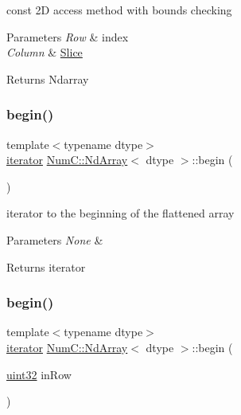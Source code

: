 const 2D access method with bounds checking


\begin{DoxyParams}{Parameters}
{\em Row} & index \\
\hline
{\em Column} & \mbox{\hyperlink{class_num_c_1_1_slice}{Slice}} \\
\hline
\end{DoxyParams}
\begin{DoxyReturn}{Returns}
Ndarray 
\end{DoxyReturn}
\mbox{\label{class_num_c_1_1_nd_array_a3bba56461121f422750bd6b7a69bd9c4}} 
\subsubsection{\texorpdfstring{begin()}{begin()}\hspace{0.1cm}{\footnotesize\ttfamily [1/2]}}
{\footnotesize\ttfamily template$<$typename dtype$>$ \\
\mbox{\hyperlink{class_num_c_1_1_nd_array_a49cd61f019d7106a40ffdb9c3ee98f08}{iterator}} \mbox{\hyperlink{class_num_c_1_1_nd_array}{Num\+C\+::\+Nd\+Array}}$<$ dtype $>$\+::begin (\begin{DoxyParamCaption}{ }\end{DoxyParamCaption})\hspace{0.3cm}{\ttfamily [inline]}}

iterator to the beginning of the flattened array


\begin{DoxyParams}{Parameters}
{\em None} & \\
\hline
\end{DoxyParams}
\begin{DoxyReturn}{Returns}
iterator 
\end{DoxyReturn}
\mbox{\label{class_num_c_1_1_nd_array_a6cca558bd443f861482a6856980fc80f}} 
\subsubsection{\texorpdfstring{begin()}{begin()}\hspace{0.1cm}{\footnotesize\ttfamily [2/2]}}
{\footnotesize\ttfamily template$<$typename dtype$>$ \\
\mbox{\hyperlink{class_num_c_1_1_nd_array_a49cd61f019d7106a40ffdb9c3ee98f08}{iterator}} \mbox{\hyperlink{class_num_c_1_1_nd_array}{Num\+C\+::\+Nd\+Array}}$<$ dtype $>$\+::begin (\begin{DoxyParamCaption}\item[{\mbox{\hyperlink{namespace_num_c_ae685802ca6d3035f2b400b081e3953fa}{uint32}}}]{in\+Row }\end{DoxyParamCaption})\hspace{0.3cm}{\ttfamily [inline]}}

